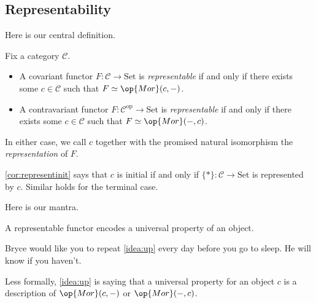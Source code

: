 \subsection{Representability}
Here is our central definition.
\begin{definition}[Representable]
	Fix a category $\mathcal C$.
	\begin{itemize}
		\item A covariant functor $F:\mathcal C\to\mathrm{Set}$ is \textit{representable} if and only if there exists some $c\in\mathcal C$ such that $F\simeq\op{Mor}(c,-)$.
		\item A contravariant functor $F:\mathcal C^{\mathrm{op}}\to\mathrm{Set}$ is \textit{representable} if and only if there exists some $c\in\mathcal C$ such that $F\simeq\op{Mor}(-,c)$.
	\end{itemize}
	In either case, we call $c$ together with the promised natural isomorphism the \textit{representation} of $F$.
\end{definition}
\begin{example}
	\autoref{cor:representinit} says that $c$ is initial if and only if $\{*\}:\mathcal C\to\mathrm{Set}$ is represented by $c$. Similar holds for the terminal case.
\end{example}
Here is our mantra.
\begin{idea} \label{idea:up}
	A representable functor encodes a universal property of an object.
\end{idea}
\begin{remark}
	Bryce would like you to repeat \autoref{idea:up} every day before you go to sleep. He will know if you haven't.
\end{remark}
Less formally, \autoref{idea:up} is saying that a universal property for an object $c$ is a description of $\op{Mor}(c,-)$ or $\op{Mor}(-,c)$.

